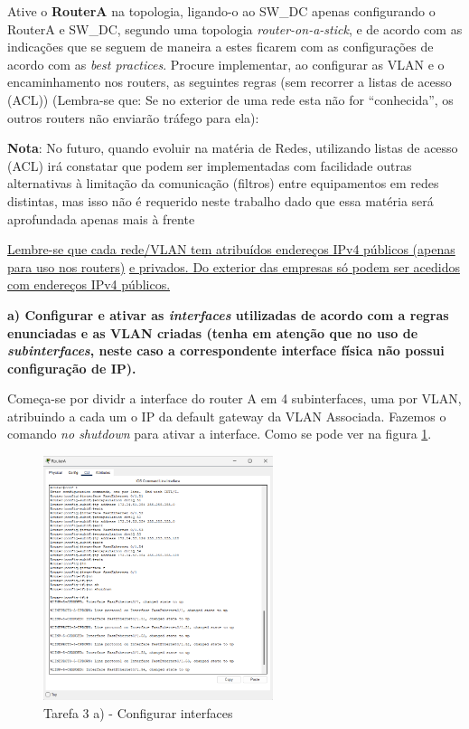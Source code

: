 \documentclass[11pt,english, openright, oneside]{book}
\begin{document}
Ative o \textbf{RouterA} na topologia, ligando-o ao SW\_DC apenas configurando o
RouterA e SW\_DC, segundo uma topologia \textit{router-on-a-stick}, e de acordo
com as indicações que se seguem de maneira a estes ficarem com as configurações
de acordo com as \textit{best practices}. Procure implementar, ao configurar as
VLAN e o encaminhamento nos routers, as seguintes regras (sem recorrer a listas
de acesso (ACL)) (Lembra-se que: Se no exterior de uma rede esta não for
“conhecida”, os outros routers não enviarão tráfego para ela):

\textbf{Nota}: No futuro, quando evoluir na matéria de Redes, utilizando listas
de acesso (ACL) irá constatar que podem ser implementadas com facilidade outras
alternativas à limitação da comunicação (filtros) entre equipamentos em redes
distintas, mas isso não é requerido neste trabalho dado que essa matéria será
aprofundada apenas mais à frente

\underline{Lembre-se que cada rede/VLAN tem atribuídos endereços IPv4 públicos (apenas para uso nos routers)}
\underline{e privados. Do exterior das empresas só podem ser acedidos com endereços IPv4 públicos.}

\vspace{0.8cm}

\textbf{a) Configurar e ativar as \textit{interfaces} utilizadas de acordo com a
regras enunciadas e as VLAN criadas (tenha em atenção que no uso de
\textit{subinterfaces}, neste caso a correspondente interface física não possui
configuração de IP).}
\vspace{0.2cm}

Começa-se por dividr a interface do router A em 4 subinterfaces, uma por VLAN,
atribuindo a cada um o IP da default gateway da VLAN Associada. Fazemos o
comando \textit{no shutdown} para ativar a interface. Como se pode ver na figura
\ref{fig:3a}.
\vspace{0.2cm}

\begin{figure}[H]
    \centering
    \includegraphics[width=0.6\textwidth]{imagens/Tarefa3/3.a.png}
    \caption{Tarefa 3 a) - Configurar interfaces}
    \label{fig:3a}
\end{figure}
\end{document}
